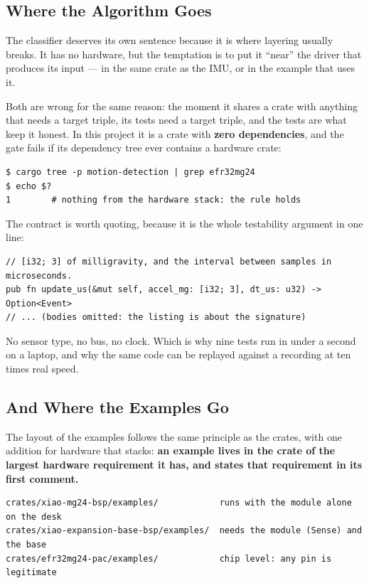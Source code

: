 \subsection{Where the Algorithm Goes}

The classifier deserves its own sentence because it is where layering usually breaks. It has
no hardware, but the temptation is to put it ``near'' the driver that produces its input — in
the same crate as the IMU, or in the example that uses it.

Both are wrong for the same reason: the moment it shares a crate with anything that needs a
target triple, its tests need a target triple, and the tests are what keep it honest. In this
project it is a crate with \textbf{zero dependencies}, and the gate fails if its dependency
tree ever contains a hardware crate:

\begin{verbatim}
$ cargo tree -p motion-detection | grep efr32mg24
$ echo $?
1        # nothing from the hardware stack: the rule holds
\end{verbatim}

The contract is worth quoting, because it is the whole testability argument in one line:

\begin{verbatim}
// [i32; 3] of milligravity, and the interval between samples in microseconds.
pub fn update_us(&mut self, accel_mg: [i32; 3], dt_us: u32) -> Option<Event>
// ... (bodies omitted: the listing is about the signature)
\end{verbatim}

No sensor type, no bus, no clock. Which is why nine tests run in under a second on a laptop,
and why the same code can be replayed against a recording at ten times real speed.

\subsection{And Where the Examples Go}

The layout of the examples follows the same principle as the crates, with one addition for
hardware that stacks: \textbf{an example lives in the crate of the largest hardware
requirement it has, and states that requirement in its first comment.}

\begin{verbatim}
crates/xiao-mg24-bsp/examples/            runs with the module alone on the desk
crates/xiao-expansion-base-bsp/examples/  needs the module (Sense) and the base
crates/efr32mg24-pac/examples/            chip level: any pin is legitimate
\end{verbatim}

